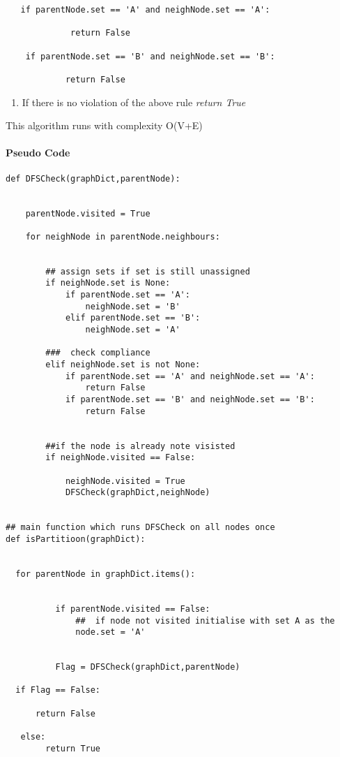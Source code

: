 \documentclass[11pt]{article}
\providecommand{\tightlist}{%
      \setlength{\itemsep}{0pt}\setlength{\parskip}{0pt}}
\begin{document}
\begin{verbatim}
   if parentNode.set == 'A' and neighNode.set == 'A':
      
             return False
     
    if parentNode.set == 'B' and neighNode.set == 'B':
     
            return False
\end{verbatim}

\begin{enumerate}
\def\labelenumi{\arabic{enumi}.}
\setcounter{enumi}{2}
\tightlist
\item
  If there is no violation of the above rule \emph{return True}
\end{enumerate}

This algorithm runs with complexity O(V+E)

    \paragraph{Pseudo Code}\label{pseudo-code}

\begin{verbatim}
def DFSCheck(graphDict,parentNode):


    parentNode.visited = True
    
    for neighNode in parentNode.neighbours:
        
        
        ## assign sets if set is still unassigned
        if neighNode.set is None:
            if parentNode.set == 'A':
                neighNode.set = 'B'
            elif parentNode.set == 'B':
                neighNode.set = 'A'
        
        ###  check compliance
        elif neighNode.set is not None:
            if parentNode.set == 'A' and neighNode.set == 'A':
                return False
            if parentNode.set == 'B' and neighNode.set == 'B':
                return False
                
        
        ##if the node is already note visisted
        if neighNode.visited == False:

            neighNode.visited = True
            DFSCheck(graphDict,neighNode)
            
            
## main function which runs DFSCheck on all nodes once  
def isPartitioon(graphDict):


  for parentNode in graphDict.items():


          if parentNode.visited == False:
              ##  if node not visited initialise with set A as the 
              node.set = 'A'


          Flag = DFSCheck(graphDict,parentNode)

  if Flag == False:

      return False  

   else:
        return True 
        
\end{verbatim}
\end{document}
